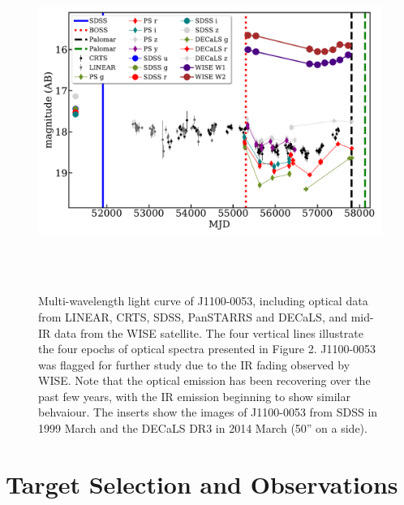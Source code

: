 \documentclass[a4paper,fleqn,usenatbib]{mnras}
\begin{document}
\begin{figure}
  \centering
  \includegraphics[width=16.00cm, height=11.00cm, trim=0.0cm 0.0cm 0.0cm 0.0cm, clip]
  {../plots/lc/J110057_lc_20180501.pdf}
  \caption[]{
    Multi-wavelength light curve of J1100-0053, including optical data
    from LINEAR, CRTS, SDSS, PanSTARRS and DECaLS, and mid-IR data from
    the WISE satellite.  The four vertical lines illustrate the four
    epochs of optical spectra presented in Figure 2.  J1100-0053 was
    flagged for further study due to the IR fading observed by WISE.  Note
    that the optical emission has been recovering over the past few years,
    with the IR emission beginning to show similar behvaiour. The inserts
    show the images of J1100-0053 from SDSS in 1999 March and the DECaLS DR3
    in 2014 March (50'' on a side). }
  \label{fig:J110057_LC_CRTS}
\end{figure}
\section{Target Selection and Observations}  
\end{document}
